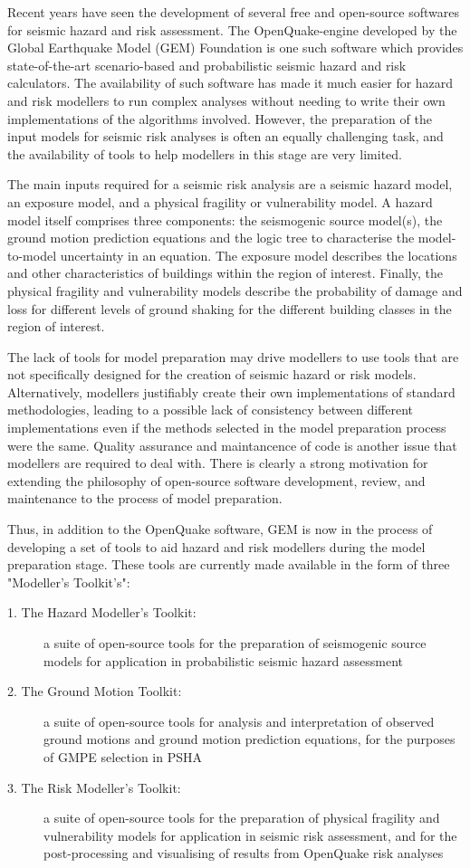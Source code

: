 Recent years have seen the development of several free and open-source softwares for seismic hazard and risk assessment. The OpenQuake-engine developed by the Global Earthquake Model (GEM) Foundation \citep{PaganiEtAl2014a} is one such software which provides state-of-the-art scenario-based and probabilistic seismic hazard and risk calculators. The availability of such software has made it much easier for hazard and risk modellers to run complex analyses without needing to write their own implementations of the algorithms involved. However, the preparation of the input models for seismic risk analyses is often an equally challenging task, and the availability of tools to help modellers in this stage are very limited.

The main inputs required for a seismic risk analysis are a seismic hazard model, an exposure model, and a physical fragility or vulnerability model. A hazard model itself comprises three components: the seismogenic source model(s), the ground motion prediction equations and the logic tree to characterise the model-to-model uncertainty in an equation. The exposure model describes the locations and other characteristics of buildings within the region of interest. Finally, the physical fragility and vulnerability models describe the probability of damage and loss for different levels of ground shaking for the different building classes in the region of interest.

The lack of tools for model preparation may drive modellers to use tools that are not specifically designed for the creation of seismic hazard or risk models. Alternatively, modellers justifiably create their own implementations of standard methodologies, leading to a possible lack of consistency between different implementations even if the methods selected in the model preparation process were the same. Quality assurance and maintancence of code is another issue that modellers are required to deal with. There is clearly a strong motivation for extending the philosophy of open-source software development, review, and maintenance to the process of model preparation.

Thus, in addition to the OpenQuake software, GEM is now in the process of developing a set of tools to aid hazard and risk modellers during the model preparation stage. These tools are currently made available in the form of three "Modeller’s Toolkit’s":
\begin{description}
\item[1. The Hazard Modeller’s Toolkit:] a suite of open-source tools for the preparation of seismogenic source models for application in probabilistic seismic hazard assessment \citep{hmtk_guide}
\item[2. The Ground Motion Toolkit:] a suite of open-source tools for analysis and interpretation of observed ground motions and ground motion prediction equations, for the purposes of GMPE selection in PSHA
\item[3. The Risk Modeller's Toolkit:] a suite of open-source tools for the preparation of physical fragility and vulnerability models for application in seismic risk assessment, and for the post-processing and visualising of results from OpenQuake risk analyses
\end{description}

